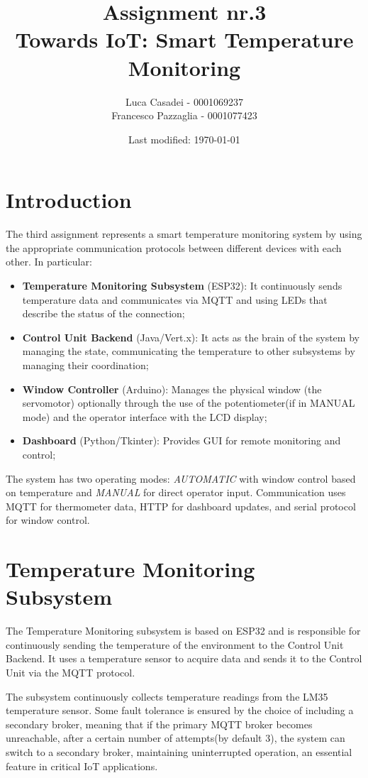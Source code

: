 \documentclass[a4paper]{article}
\author{Luca Casadei - 0001069237\\Francesco Pazzaglia - 0001077423}
\date{Last modified: \today}
\title{\textbf{Assignment nr.3\\Towards IoT: Smart Temperature Monitoring}}
\begin{document}
	\maketitle
	\tableofcontents
	
	\section{Introduction}
	The third assignment represents a smart temperature monitoring system by using the appropriate communication protocols between different devices with each other. In particular:
	
	\begin{itemize}
		\item \textbf{Temperature Monitoring Subsystem} (ESP32): It continuously sends temperature data and communicates via MQTT and using LEDs that describe the status of the connection;
		\item \textbf{Control Unit Backend} (Java/Vert.x): It acts as the brain of the system by managing the state, communicating the temperature to other subsystems by managing their coordination;
		\item \textbf{Window Controller} (Arduino): Manages the physical window (the servomotor) optionally through the use of the potentiometer(if in MANUAL mode) and the operator interface with the LCD display;
		\item \textbf{Dashboard} (Python/Tkinter): Provides GUI for remote monitoring and control;
	\end{itemize}
	
	The system has two operating modes: \textit{AUTOMATIC} with window control based on temperature and \textit{MANUAL} for direct operator input. Communication uses MQTT for thermometer data, HTTP for dashboard updates, and serial protocol for window control.
	
	\section{Temperature Monitoring Subsystem}
	The Temperature Monitoring subsystem is based on ESP32 and is responsible for continuously sending the temperature of the environment to the Control Unit Backend. It uses a temperature sensor to acquire data and sends it to the Control Unit via the MQTT protocol.
	
	The subsystem continuously collects temperature readings from the LM35 temperature sensor.  Some fault tolerance is ensured by the choice of including a secondary broker, meaning that if the primary MQTT broker becomes unreachable, after a certain number of attempts(by default 3), the system can switch to a secondary broker, maintaining uninterrupted operation, an essential feature in critical IoT applications.
	
\end{document}
